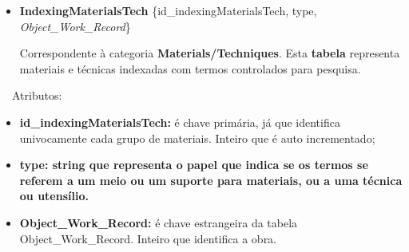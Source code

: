 \documentclass[letterpaper]{article}
\newcommand\textstyleStrongEmphasis[1]{\textbf{#1}}
\newcommand\liststyleLi{%
\renewcommand\labelitemi{{\textbullet}}
\renewcommand\labelitemii{[27A2?]}
\renewcommand\labelitemiii{{\textbullet}}
\renewcommand\labelitemiv{{\textbullet}}
}
\newcommand\liststyleLvi{%
\renewcommand\labelitemi{[27A2?]}
\renewcommand\labelitemii{[27A2?]}
\renewcommand\labelitemiii{[27A2?]}
\renewcommand\labelitemiv{[27A2?]}
}
\begin{document}
\bigskip

\liststyleLi
\begin{itemize}
\item {
\textbf{IndexingMaterialsTech} \{id\_indexingMaterialsTech, type,
\textit{Object\_Work\_Record}\}}

\foreignlanguage{english}{Correspondente \`a categoria
}\textstyleStrongEmphasis{\foreignlanguage{english}{Materials/Techniques}}\foreignlanguage{english}{.
Esta
}\textstyleStrongEmphasis{\foreignlanguage{english}{\textmd{tabela}}}\foreignlanguage{english}{
representa materiais e t\'ecnicas indexadas com termos controlados para
pesquisa.}
\end{itemize}

\bigskip

{
\ \ Atributos:}

\liststyleLvi
\begin{itemize}
\item {
\textbf{id\_indexingMaterialsTech:} \'e chave prim\'aria, j\'a que
identifica univocamente cada grupo de materiais. Inteiro que \'e auto
incrementado;}
\item {\bfseries
type:\textmd{ string que representa o papel que indica se os termos se
referem a um meio ou um suporte para materiais, ou a uma t\'ecnica ou
utens\'ilio.}}
\item {
\textbf{Object\_Work\_Record:}\textit{ }\'e chave estrangeira da tabela
Object\_Work\_Record. Inteiro que identifica a obra.}
\end{itemize}

\bigskip
\end{document}
